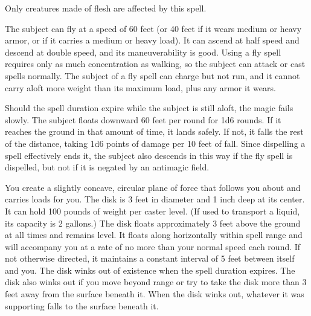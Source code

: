 \begin{multicols}{2}
\begin{small}
\smallskip\noindent Only creatures made of flesh are affected by this spell.


\noindent The subject can fly at a speed of 60 feet (or 40 feet if it wears medium or heavy armor, or if it carries a medium or heavy load). It can ascend at half speed and descend at double speed, and its maneuverability is good. Using a fly spell requires only as much concentration as walking, so the subject can attack or cast spells normally. The subject of a fly spell can charge but not run, and it cannot carry aloft more weight than its maximum load, plus any armor it wears.

\smallskip\noindent Should the spell duration expire while the subject is still aloft, the magic fails slowly. The subject floats downward 60 feet per round for 1d6 rounds. If it reaches the ground in that amount of time, it lands safely. If not, it falls the rest of the distance, taking 1d6 points of damage per 10 feet of fall. Since dispelling a spell effectively ends it, the subject also descends in this way if the fly spell is dispelled, but not if it is negated by an antimagic field.


\noindent You create a slightly concave, circular plane of force that follows you about and carries loads for you. The disk is 3 feet in diameter and 1 inch deep at its center. It can hold 100 pounds of weight per caster level. (If used to transport a liquid, its capacity is 2 gallons.) The disk floats approximately 3 feet above the ground at all times and remains level. It floats along horizontally within spell range and will accompany you at a rate of no more than your normal speed each round. If not otherwise directed, it maintains a constant interval of 5 feet between itself and you. The disk winks out of existence when the spell duration expires. The disk also winks out if you move beyond range or try to take the disk more than 3 feet away from the surface beneath it. When the disk winks out, whatever it was supporting falls to the surface beneath it.


\end{small}
\end{multicols}

